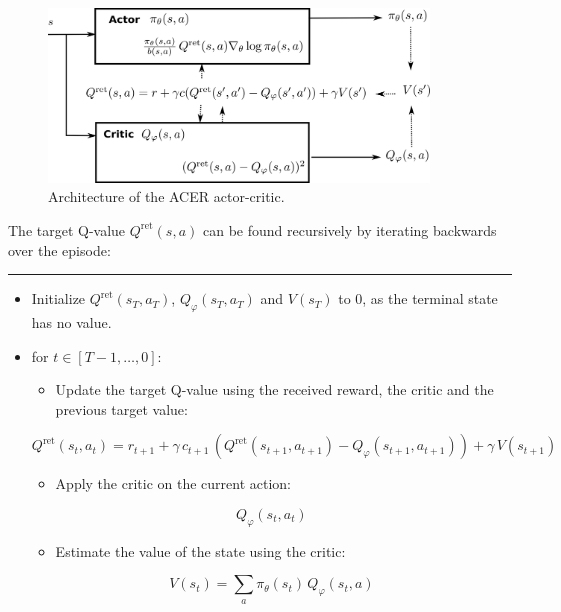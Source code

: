 \documentclass[
  letterpaper,
  DIV=11,
  numbers=noendperiod]{scrreprt}
\providecommand{\tightlist}{%
  \setlength{\itemsep}{0pt}\setlength{\parskip}{0pt}}\usepackage{longtable,booktabs,array}
\begin{document}
\begin{figure}

{\centering \includegraphics[width=0.9\textwidth,height=\textheight]{./img/acer.png}

}

\caption{\label{fig-acer}Architecture of the ACER actor-critic.}

\end{figure}

The target Q-value \(Q^\text{ret}(s, a)\) can be found recursively by
iterating backwards over the episode:

\begin{center}\rule{0.5\linewidth}{0.5pt}\end{center}

\begin{itemize}
\item
  Initialize \(Q^\text{ret}(s_T, a_T)\), \(Q_\varphi(s_T, a_T)\) and
  \(V(s_T)\) to 0, as the terminal state has no value.
\item
  for \(t \in [T-1, \ldots, 0]\):

  \begin{itemize}
  \tightlist
  \item
    Update the target Q-value using the received reward, the critic and
    the previous target value:
  \end{itemize}

  \[
        Q^\text{ret}(s_t, a_t) = r_{t+1} + \gamma \, c_{t+1} \, (Q^\text{ret}(s_{t+1}, a_{t+1}) - Q_\varphi(s_{t+1}, a_{t+1})) + \gamma \, V(s_{t+1})
    \]

  \begin{itemize}
  \tightlist
  \item
    Apply the critic on the current action:
  \end{itemize}

  \[
        Q_\varphi(s_t, a_t)
    \]

  \begin{itemize}
  \tightlist
  \item
    Estimate the value of the state using the critic:
  \end{itemize}

  \[
        V(s_t) = \sum_a \pi_\theta(s_t) \, Q_\varphi(s_t, a)
    \]
\end{itemize}
\end{document}
